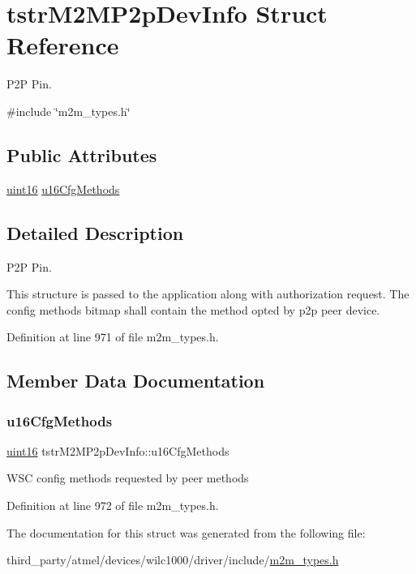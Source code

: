 \hypertarget{structtstrM2MP2pDevInfo}{}\section{tstr\+M2\+M\+P2p\+Dev\+Info Struct Reference}
\label{structtstrM2MP2pDevInfo}


P2P Pin.  




{\ttfamily \#include \char`\"{}m2m\+\_\+types.\+h\char`\"{}}

\subsection*{Public Attributes}
\begin{DoxyCompactItemize}
\item 
\hyperlink{group__DataT_ga1daa745171fc6e31d942c161422a76f9}{uint16} \hyperlink{structtstrM2MP2pDevInfo_a3b622ee5784fce40ab909b791d648535}{u16\+Cfg\+Methods}
\end{DoxyCompactItemize}


\subsection{Detailed Description}
P2P Pin. 

This structure is passed to the application along with authorization request. The config methods bitmap shall contain the method opted by p2p peer device. 

Definition at line 971 of file m2m\+\_\+types.\+h.



\subsection{Member Data Documentation}
\mbox{\label{structtstrM2MP2pDevInfo_a3b622ee5784fce40ab909b791d648535}} 
\subsubsection{\texorpdfstring{u16\+Cfg\+Methods}{u16CfgMethods}}
{\footnotesize\ttfamily \hyperlink{group__DataT_ga1daa745171fc6e31d942c161422a76f9}{uint16} tstr\+M2\+M\+P2p\+Dev\+Info\+::u16\+Cfg\+Methods}

W\+SC config methods requested by peer methods 

Definition at line 972 of file m2m\+\_\+types.\+h.



The documentation for this struct was generated from the following file\+:\begin{DoxyCompactItemize}
\item 
third\+\_\+party/atmel/devices/wilc1000/driver/include/\hyperlink{m2m__types_8h}{m2m\+\_\+types.\+h}\end{DoxyCompactItemize}
